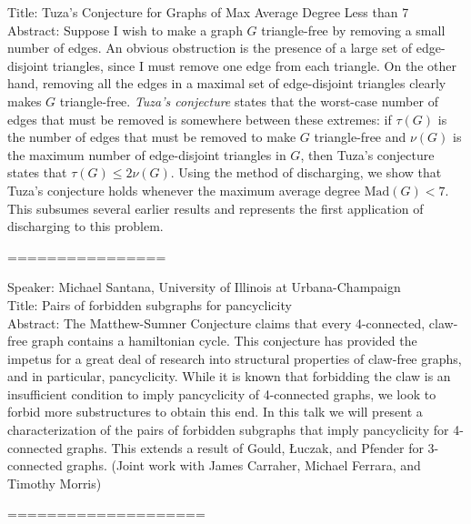 \documentclass[11pt]{article}
\begin{document}
Title:  Tuza's Conjecture for Graphs of Max Average Degree Less than 7 \\

Abstract:  Suppose I wish to make a graph $G$ triangle-free by removing a
small
number of edges.  An obvious obstruction is the presence of a large
set of edge-disjoint triangles, since I must remove one edge from each
triangle. On the other hand, removing all the edges in a maximal set
of edge-disjoint triangles clearly makes $G$ triangle-free.
\emph{Tuza's conjecture} states that the worst-case number of edges
that must be removed is somewhere between these extremes: if $\tau(G)$
is the number of edges that must be removed to make $G$ triangle-free
and $\nu(G)$ is the maximum number of edge-disjoint triangles in $G$,
then Tuza's conjecture states that $\tau(G) \leq 2\nu(G)$. Using the
method of discharging, we show that Tuza's conjecture holds whenever
the maximum average degree $\mathrm{Mad}(G) < 7$. This subsumes
several earlier results and represents the first application of
discharging to this problem. 



================

Speaker: Michael Santana, University of Illinois at Urbana-Champaign\\
Title:  Pairs of forbidden subgraphs for pancyclicity\\
Abstract:  The Matthew-Sumner Conjecture claims that every 4-connected,
claw-free graph contains a hamiltonian cycle.  This conjecture has provided
the impetus for a great deal of research into structural properties of
claw-free graphs, and in particular, pancyclicity.  While it is known that
forbidding the claw is an insufficient condition to imply pancyclicity of
4-connected graphs, we look to forbid more substructures to obtain this end.
In this talk we will present a characterization of the pairs of forbidden
subgraphs that imply pancyclicity for 4-connected graphs.  This extends a
result of Gould, {\L}uczak, and Pfender for 3-connected graphs.  (Joint work
with James Carraher, Michael Ferrara, and Timothy Morris) 

====================
\end{document}
